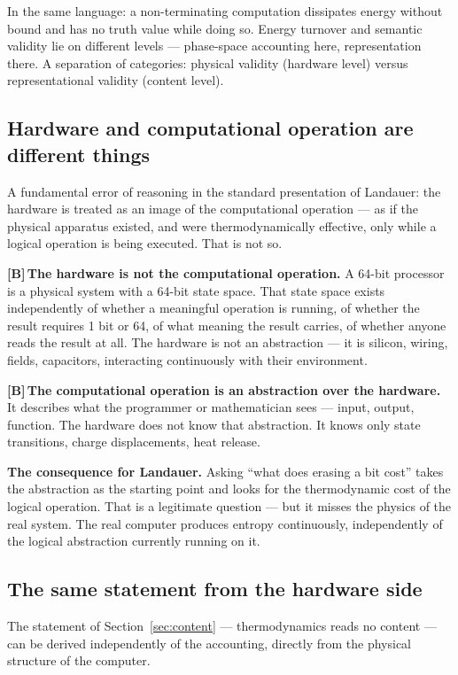 \documentclass[11pt,a4paper]{article}
\newcommand{\LB}{\textcolor{layB}{\textbf{\footnotesize\textsf{[B]}}}\,}
\begin{document}
In the same language: a non-terminating computation dissipates energy without
bound and has no truth value while doing so. Energy turnover and semantic validity
lie on different levels --- phase-space accounting here, representation there. A
separation of categories: physical validity (hardware level) versus
representational validity (content level).

\subsection{Hardware and computational operation are different things}

A fundamental error of reasoning in the standard presentation of Landauer: the
hardware is treated as an image of the computational operation --- as if the
physical apparatus existed, and were thermodynamically effective, only while a
logical operation is being executed. That is not so.

\LB \textbf{The hardware is not the computational operation.} A 64-bit processor
is a physical system with a 64-bit state space. That state space exists
independently of whether a meaningful operation is running, of whether the result
requires 1 bit or 64, of what meaning the result carries, of whether anyone reads
the result at all. The hardware is not an abstraction --- it is silicon, wiring,
fields, capacitors, interacting continuously with their environment.

\LB \textbf{The computational operation is an abstraction over the hardware.} It
describes what the programmer or mathematician sees --- input, output, function.
The hardware does not know that abstraction. It knows only state transitions,
charge displacements, heat release.

\textbf{The consequence for Landauer.} Asking “what does erasing a bit cost”
takes the abstraction as the starting point and looks for the thermodynamic cost
of the logical operation. That is a legitimate question --- but it misses the
physics of the real system. The real computer produces entropy continuously,
independently of the logical abstraction currently running on it.

\subsection{The same statement from the hardware side}

The statement of Section~\ref{sec:content} --- thermodynamics reads no content ---
can be derived independently of the accounting, directly from the physical
structure of the computer.
\end{document}
